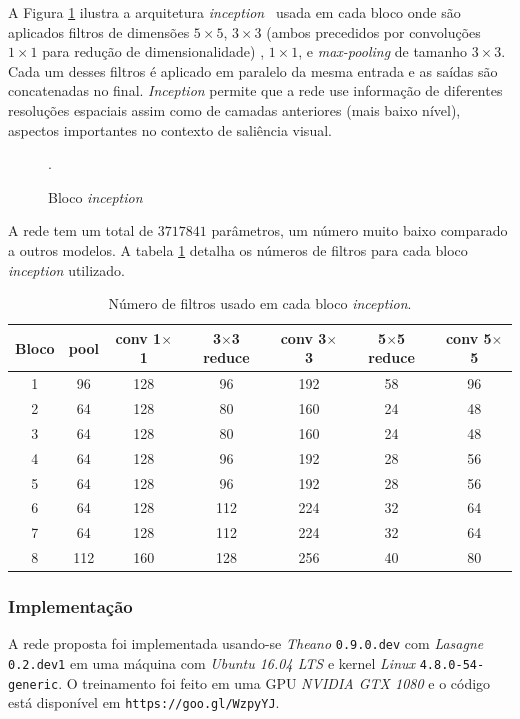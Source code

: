 \documentclass[11pt]{article}
\newcommand{\tit}[1]{\textit{#1}}
\begin{document}
A Figura \ref{fig:newinception} ilustra a arquitetura
\tit{inception}~\cite{szegedy_2014}
usada em cada bloco onde são aplicados
filtros de dimensões $5 \times 5$, $3 \times 3$
(ambos precedidos por convoluções $1\times 1$ para redução de dimensionalidade)
, $1 \times 1$, e \tit{max-pooling} de tamanho $3 \times 3$.
Cada um desses filtros é aplicado em paralelo da mesma entrada e as saídas
são concatenadas no final.
\tit{Inception} permite que a rede use informação de diferentes resoluções
espaciais assim como de camadas anteriores (mais baixo nível),
aspectos importantes no contexto de saliência visual.

\begin{figure}[H]
    \centering
    \def\svgwidth{0.57\linewidth}
    
    \caption{Bloco \tit{inception}}.
   \label{fig:newinception}
\end{figure}

A rede tem um total de $3717841$ parâmetros, um número muito baixo comparado
a outros modelos.
A tabela \ref{table:inception} detalha os números de filtros para cada
bloco \tit{inception} utilizado.

\begin{table}[H]
\centering
	\small
\label{table:inception}
\caption{Número de filtros usado em cada bloco \tit{inception}.}
\begin{tabular}{|c|c|c|c|c|c|c|}
	\hline
    Bloco & pool & conv 1$\times$1 & 3$\times$3 reduce &
    conv 3$\times$3 & 5$\times$5 reduce & conv 5$\times$5\\
    \hline
    1 & 96 & 128 & 96 & 192 & 58 & 96\\
    \hline
    2 & 64 & 128 & 80 & 160 & 24 & 48\\
    \hline
    3 & 64 & 128 & 80 & 160 & 24 & 48\\
    \hline
    4 & 64 & 128 & 96 & 192 & 28 & 56\\
    \hline
    5 & 64 & 128 & 96 & 192 & 28 & 56\\
    \hline
    6 & 64 & 128 & 112 & 224 & 32 & 64\\
    \hline
    7 & 64 & 128 & 112 & 224 & 32 & 64\\
    \hline
    8 & 112 & 160 & 128 & 256 & 40 & 80\\
    \hline
\end{tabular}
\end{table}

\subsubsection{Implementação}
A rede proposta foi implementada usando-se \emph{Theano} \texttt{0.9.0.dev}
com \emph{Lasagne} \texttt{0.2.dev1}
em uma máquina com \emph{Ubuntu 16.04 LTS} e
kernel \emph{Linux} \texttt{4.8.0-54-generic}.
O treinamento foi feito em uma GPU \emph{NVIDIA GTX 1080} e o código está
disponível em \texttt{https://goo.gl/WzpyYJ}.
\end{document}

